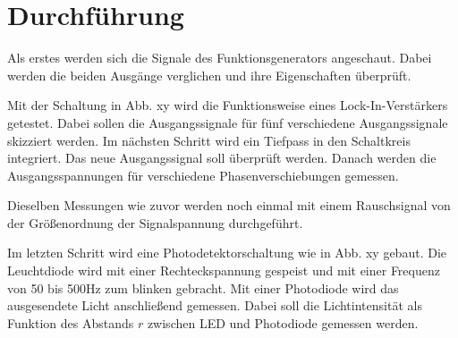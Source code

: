\section{Durchführung}
\label{sec:Durchführung}

Als erstes werden sich die Signale des Funktionsgenerators angeschaut. Dabei werden die beiden Ausgänge verglichen und ihre Eigenschaften überprüft. 

Mit der Schaltung in Abb. xy wird die Funktionsweise eines Lock-In-Verstärkers getestet. Dabei sollen die Ausgangssignale für fünf verschiedene Ausgangssignale skizziert werden. Im nächsten Schritt wird ein Tiefpass in den Schaltkreis integriert. Das neue Ausgangssignal soll überprüft werden. 
Danach werden die Ausgangsspannungen für verschiedene Phasenverschiebungen gemessen. 

Dieselben Messungen wie zuvor werden noch einmal mit einem Rauschsignal von der Größenordnung der Signalspannung durchgeführt.

Im letzten Schritt wird eine Photodetektorschaltung wie in Abb. xy gebaut. Die Leuchtdiode wird mit einer Rechteckspannung gespeist und mit einer Frequenz von 50 bis 500Hz zum blinken gebracht. Mit einer Photodiode wird das ausgesendete Licht anschließend gemessen. Dabei soll die Lichtintensität als Funktion des Abstands $r$ zwischen LED und Photodiode gemessen werden. 


